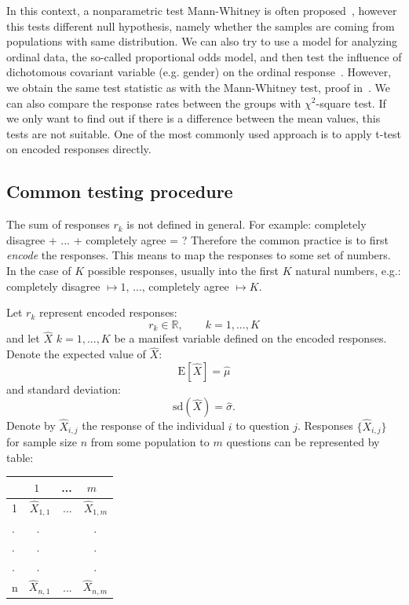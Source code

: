 \documentclass[10pt]{article}
\begin{document}
In this context, a nonparametric test Mann-Whitney is often proposed~\cite{Winter}, however this tests different null hypothesis, namely whether the samples are coming from populations with same distribution. We can also try to use a model for analyzing ordinal data, the so-called proportional odds model, and then test the influence of dichotomous covariant variable (e.g. gender) on the ordinal response~\cite{McCullagh}. However, we obtain the same test statistic as with the Mann-Whitney test, proof in~\cite{Natarajan}. We can also compare the response rates between the groups with $\chi^{2}$-square test. If we only want to find out if there is a difference between the mean values, this tests are not suitable. One of the most commonly used approach is to apply t-test on encoded responses directly.

\subsection{Common testing procedure} \label{sec: fail_test_stat}
The sum of responses $r_{k}$ is not defined in general. For example: completely disagree + ... + completely agree = ? Therefore the common practice is to first {\it encode} the responses. This means to map the responses to some set of numbers. In the case of $K$ possible responses, usually into the first $K$ natural numbers, e.g.: completely disagree $\mapsto 1$, ..., completely agree $\mapsto K$. 

Let $r_{k}$ represent encoded responses:
\begin{equation}
r_{k} \in \mathbb{R}, \qquad k = 1,...,K
\end{equation}
and let $\hat{X}$  $k = 1,..., K$ be a manifest variable defined on the encoded responses. Denote the expected value of $\hat{X}$: 
$$
\mathrm{E}[\hat{X}] = \hat{\mu}
$$ and standard deviation:
$$
\mathrm{sd}(\hat{X}) = \hat{\sigma}.
$$
Denote by $\hat{X}_{i, j}$ the response of the individual $i$ to question $j$. Responses $\lbrace \hat{X}_{i, j} \rbrace$ for sample size $n$ from some population to $m$ questions can be represented by table:
\begin{center}
\begin{tabular}{l|rrr}
     & $1 \quad$ & ... & $m \quad$ \\ 
  \hline
  1 & $\hat{X}_{1,1}$ & ... & $\hat{X}_{1,m}$ \rule{0pt}{3ex} \\
  $.$ &  $. \quad$ & & $. \quad$ \rule{0pt}{0.05ex} \\
  $.$ &  $. \quad$ & & $. \quad$ \rule{0pt}{0.05ex} \\
  $.$ &  $. \quad$ & & $. \quad$ \rule{0pt}{0.05ex} \\
  n & $\hat{X}_{n,1}$ & ... & $\hat{X}_{n,m}$ \rule{0pt}{3ex} \end{tabular}
\end{center}
\end{document}
